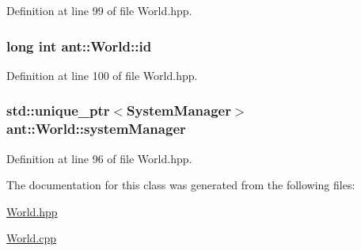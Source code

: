 Definition at line 99 of file World.\+hpp.

\hypertarget{classant_1_1_world_ac55101558f7c8a7ca6abcf641a4e7b1b}{
\subsubsection[{id}]{\setlength{\rightskip}{0pt plus 5cm}long int ant\+::\+World\+::id\hspace{0.3cm}{\ttfamily [private]}}}\label{classant_1_1_world_ac55101558f7c8a7ca6abcf641a4e7b1b}


Definition at line 100 of file World.\+hpp.

\hypertarget{classant_1_1_world_afa36ceca0aa8d3ce8e19d6e542fe767e}{
\subsubsection[{system\+Manager}]{\setlength{\rightskip}{0pt plus 5cm}std\+::unique\+\_\+ptr$<${\bf System\+Manager}$>$ ant\+::\+World\+::system\+Manager\hspace{0.3cm}{\ttfamily [private]}}}\label{classant_1_1_world_afa36ceca0aa8d3ce8e19d6e542fe767e}


Definition at line 96 of file World.\+hpp.



The documentation for this class was generated from the following files\+:\begin{DoxyCompactItemize}
\item 
\hyperlink{_world_8hpp}{World.\+hpp}\item 
\hyperlink{_world_8cpp}{World.\+cpp}\end{DoxyCompactItemize}
